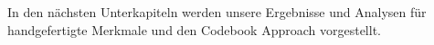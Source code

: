 
In den n{\"a}chsten Unterkapiteln werden unsere Ergebnisse und Analysen f{\"u}r handgefertigte Merkmale und den Codebook Approach vorgestellt.










